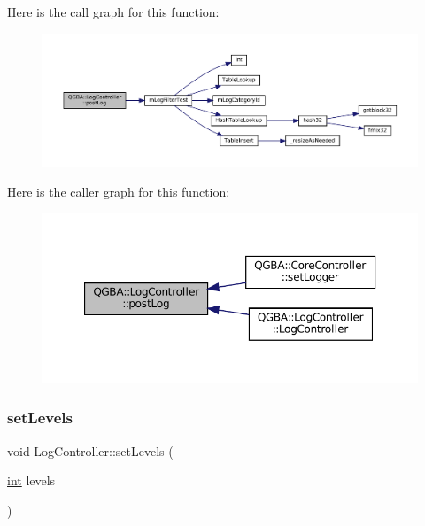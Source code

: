 Here is the call graph for this function\+:
\nopagebreak
\begin{figure}[H]
\begin{center}
\leavevmode
\includegraphics[width=350pt]{class_q_g_b_a_1_1_log_controller_a92daac6ce0f52df639ee8911d0de82c7_cgraph}
\end{center}
\end{figure}
Here is the caller graph for this function\+:
\nopagebreak
\begin{figure}[H]
\begin{center}
\leavevmode
\includegraphics[width=350pt]{class_q_g_b_a_1_1_log_controller_a92daac6ce0f52df639ee8911d0de82c7_icgraph}
\end{center}
\end{figure}
\mbox{\label{class_q_g_b_a_1_1_log_controller_a2aedba693013b937e0020396913db8fb}} 
\subsubsection{\texorpdfstring{set\+Levels}{setLevels}}
{\footnotesize\ttfamily void Log\+Controller\+::set\+Levels (\begin{DoxyParamCaption}\item[{\mbox{\hyperlink{ioapi_8h_a787fa3cf048117ba7123753c1e74fcd6}{int}}}]{levels }\end{DoxyParamCaption})\hspace{0.3cm}{\ttfamily [slot]}}

